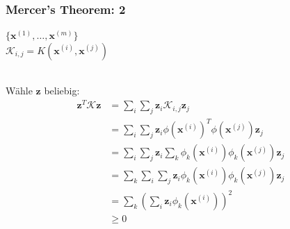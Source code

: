 	\begin{frame}
		\frametitle{Mercer's Theorem: 2}
			$\{ \boldsymbol{x}^{(1)}, \dots, \boldsymbol{x}^{(m)} \}$ \\
			$\mathcal{K}_{i,j} = K(\boldsymbol{x}^{(i)}, \boldsymbol{x}^{(j)})$ \\\
			
			Wähle $\boldsymbol{z}$ beliebig:
			\begin{align*}
				\boldsymbol{z}^{T} \mathcal{K} \boldsymbol{z} &= \sum_{i} \sum_{j} \boldsymbol{z}_{i} \mathcal{K}_{i,j} \boldsymbol{z}_{j} \\
															  &= \sum_{i} \sum_{j} \boldsymbol{z}_{i} \phi(\boldsymbol{x}^{(i)})^{T} \phi(\boldsymbol{x}^{(j)}) \boldsymbol{z}_{j} \\
															  &= \sum_{i} \sum_{j} \boldsymbol{z}_{i} \sum_{k} \phi_{k}(\boldsymbol{x}^{(i)}) \phi_{k}(\boldsymbol{x}^{(j)}) \boldsymbol{z}_{j} \\
															  &= \sum_{k} \sum_{i} \sum_{j} \boldsymbol{z}_{i} \phi_{k}(\boldsymbol{x}^{(i)}) \phi_{k}(\boldsymbol{x}^{(j)}) \boldsymbol{z}_{j} \\
															  &= \sum_{k} \left( \sum_{i} \boldsymbol{z}_{i} \phi_{k}(\boldsymbol{x}^{(i)}) \right)^{2} \\
															  &\ge 0 \\
			\end{align*}
	\end{frame}
	
